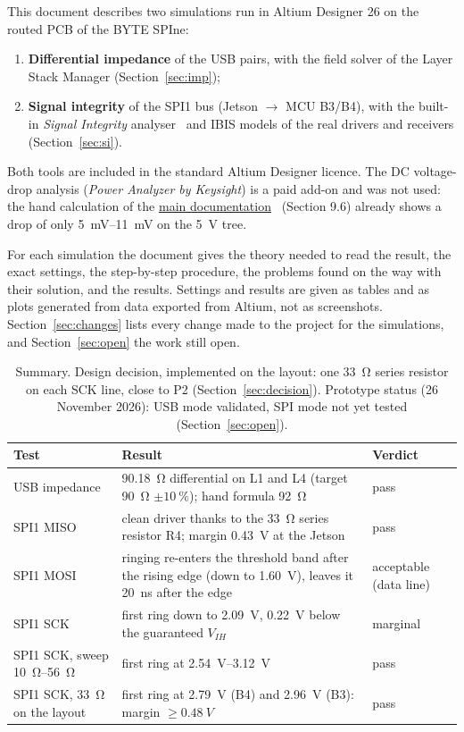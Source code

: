 \documentclass[11pt,a4paper]{article}
\newcommand{\maindoc}{\href{run:BYTE_SPIne_Documentation.pdf}{main documentation}~\cite{main}}
\begin{document}
\noindent This document describes two simulations run in Altium Designer 26 on the routed PCB of the
BYTE SPIne:
\begin{enumerate}[nosep]
    \item \textbf{Differential impedance} of the USB pairs, with the field solver of the Layer Stack Manager
    (Section~\ref{sec:imp});
    \item \textbf{Signal integrity} of the SPI1 bus (Jetson $\to$ MCU B3/B4), with the built-in \textit{Signal Integrity}
    analyser~\cite{altiumsi} and IBIS models of the real drivers and receivers (Section~\ref{sec:si}).
\end{enumerate}
\noindent Both tools are included in the standard Altium Designer licence. The DC voltage-drop analysis
(\textit{Power Analyzer by Keysight}) is a paid add-on and was not used: the hand calculation of the
\maindoc{} (Section 9.6) already shows a drop of only \qtyrange{5}{11}{mV} on the \qty{5}{V}
tree.

For each simulation the document gives the theory needed to read the result, the exact
settings, the step-by-step procedure, the problems found on the way with their solution, and the
results. Settings and results are given as tables and as plots generated from data exported from
Altium, not as screenshots. Section~\ref{sec:changes} lists every change made to the project for the simulations,
and Section~\ref{sec:open} the work still open.

\begin{table}[H]
\centering
\begin{tabular}{>{\raggedright\arraybackslash}p{}>{\raggedright\arraybackslash}p{}l}
\toprule
Test & Result & Verdict \\
\midrule
USB impedance & \qty{90.18}{\ohm} differential on L1 and L4 (target \qty{90}{\ohm} $\pm\qty{10}{\percent}$); hand formula \qty{92}{\ohm} & pass \\
SPI1 MISO & clean driver thanks to the \qty{33}{\ohm} series resistor R4; margin \qty{0.43}{V} at the Jetson & pass \\
SPI1 MOSI & ringing re-enters the threshold band after the rising edge (down to \qty{1.60}{V}), leaves it \qty{20}{ns} after the edge & acceptable (data line) \\
SPI1 SCK & first ring down to \qty{2.09}{V}, \qty{0.22}{V} below the guaranteed $V_{IH}$ & marginal \\
SPI1 SCK, sweep \qtyrange[range-phrase=--, range-units=single]{10}{56}{\ohm} & first ring at \qtyrange{2.54}{3.12}{V} & pass \\
SPI1 SCK, \qty{33}{\ohm} on the layout & first ring at \qty{2.79}{V} (B4) and \qty{2.96}{V} (B3): margin $\geq\qty{0.48}{V}$ & pass \\
\bottomrule
\end{tabular}
\caption{Summary. Design decision, implemented on the layout: one \qty{33}{\ohm} series resistor on each
SCK line, close to P2 (Section~\ref{sec:decision}). Prototype status (26 November 2026): USB mode
validated, SPI mode not yet tested (Section~\ref{sec:open}).}
\label{tab:summary}
\end{table}
\end{document}
